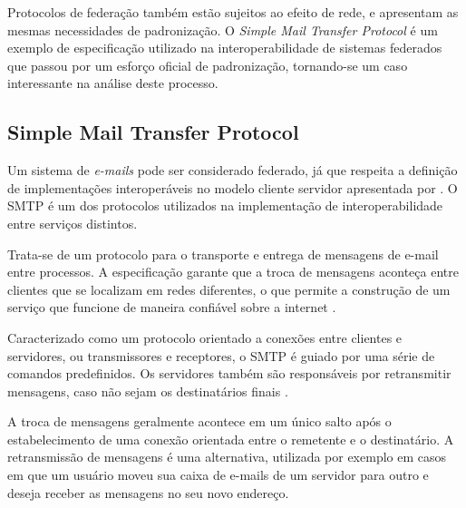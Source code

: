 Protocolos de federação também estão sujeitos ao efeito de rede, e apresentam as
mesmas necessidades de padronização. O \textit{Simple Mail Transfer Protocol} é um
exemplo de especificação utilizado na interoperabilidade de sistemas federados que
passou por um esforço oficial de padronização, tornando-se um caso interessante na
análise deste processo.


\subsection{Simple Mail Transfer Protocol}

\begin{sloppypar}
Um sistema de \textit{e-mails} pode ser considerado federado, já que respeita a
definição de implementações interoperáveis no modelo cliente servidor apresentada
por \cite{barocas2012}. O SMTP é um dos protocolos utilizados na implementação de
interoperabilidade entre serviços distintos.
\end{sloppypar}

Trata-se de um protocolo para o transporte e entrega de mensagens de e-mail entre
processos. A especificação garante que a troca de mensagens aconteça entre clientes
que se localizam em redes diferentes, o que permite a construção de um serviço que
funcione de maneira confiável sobre a internet \cite{rfc2821}.

Caracterizado como um protocolo orientado a conexões entre clientes e servidores, ou
transmissores e receptores, o SMTP é guiado por uma série de comandos predefinidos.
Os servidores também são responsáveis por retransmitir mensagens, caso não sejam os
destinatários finais \cite{kurose2012}.

A troca de mensagens geralmente acontece em um único salto após o estabelecimento de
uma conexão orientada entre o remetente e o destinatário. A retransmissão de
mensagens é uma alternativa, utilizada por exemplo em casos em que um usuário moveu
sua caixa de e-mails de um servidor para outro e deseja receber as mensagens no seu
novo endereço.

